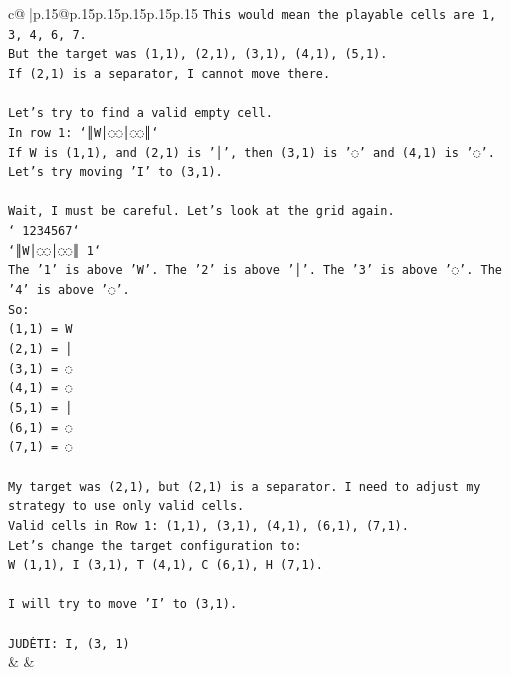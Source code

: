 \documentclass{article}
\begin{document}
{\begin{supertabular}{c@{$\;$}|p{.15\linewidth}@{}p{.15\linewidth}p{.15\linewidth}p{.15\linewidth}p{.15\linewidth}p{.15\linewidth}}
{{{\texttt{This would mean the playable cells are 1, 3, 4, 6, 7.} \\
\texttt{But the target was (1,1), (2,1), (3,1), (4,1), (5,1).} \\
\texttt{If (2,1) is a separator, I cannot move there.} \\
\\ 
\texttt{Let's try to find a valid empty cell.} \\
\texttt{In row 1: `║W│◌◌│◌◌║`} \\
\texttt{If W is (1,1), and (2,1) is '│', then (3,1) is '◌' and (4,1) is '◌'.} \\
\texttt{Let's try moving 'I' to (3,1).} \\
\\ 
\texttt{Wait, I must be careful. Let's look at the grid again.} \\
\texttt{` 1234567`} \\
\texttt{`║W│◌◌│◌◌║ 1`} \\
\texttt{The '1' is above 'W'. The '2' is above '│'. The '3' is above '◌'. The '4' is above '◌'.} \\
\texttt{So:} \\
\texttt{(1,1) = W} \\
\texttt{(2,1) = │} \\
\texttt{(3,1) = ◌} \\
\texttt{(4,1) = ◌} \\
\texttt{(5,1) = │} \\
\texttt{(6,1) = ◌} \\
\texttt{(7,1) = ◌} \\
\\ 
\texttt{My target was (2,1), but (2,1) is a separator. I need to adjust my strategy to use only valid cells.} \\
\texttt{Valid cells in Row 1: (1,1), (3,1), (4,1), (6,1), (7,1).} \\
\texttt{Let's change the target configuration to:} \\
\texttt{W (1,1), I (3,1), T (4,1), C (6,1), H (7,1).} \\
\\ 
\texttt{I will try to move 'I' to (3,1).} \\
\\ 
\texttt{JUDĖTI: I, (3, 1)} \\
            }
        }
    }
    & & \\ \\


\end{supertabular}}
\end{document}
